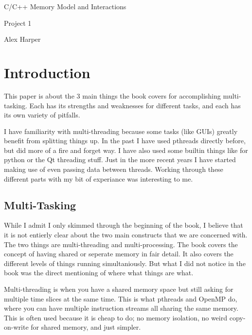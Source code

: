 \documentclass[12pt]{article}
\begin{document}
\begin{titlepage}
	\centering
	{\Huge C/C++ Memory Model and Interactions\par}
	\vspace{0.25in}
	{\Large Project 1\par}
	\vspace{2in}
	{Alex Harper\par}
	\newpage
\end{titlepage}

\tableofcontents
\newpage

\listoffigures
\newpage
\setlength{\parindent}{4em}
\setlength{\parskip}{1em}


\section{Introduction}

This paper is about the 3 main things the book covers for accomplishing multi-tasking.
Each has its strengths and weaknesses for different tasks, and each has its own variety of pitfalls.

I have familiarity with multi-threading because some tasks (like GUIs) greatly benefit from splitting things up.
In the past I have used pthreads directly before, but did more of a fire and forget way.
I have also used some builtin things like for python or the Qt threading stuff.
Just in the more recent years I have started making use of even passing data between threads.
Working through these different parts with my bit of experiance was interesting to me.

\subsection{Multi-Tasking}

While I admit I only skimmed through the beginning of the book, I believe that it is not entierly clear about the two main constructs that we are concerned with.
The two things are multi-threading and multi-processing.
The book covers the concept of having shared or seperate memory in fair detail.
It also covers the different levels of things running simultaniously.
But what I did not notice in the book was the direct mentioning of where what things are what.

Multi-threading is when you have a shared memory space but still asking for multiple time slices at the same time.
This is what pthreads and OpenMP do, where you can have multiple instruction streams all sharing the same memory.
This is often used because it is cheap to do; no memory isolation, no weird copy-on-write for shared memory, and just simpler.
\end{document}
